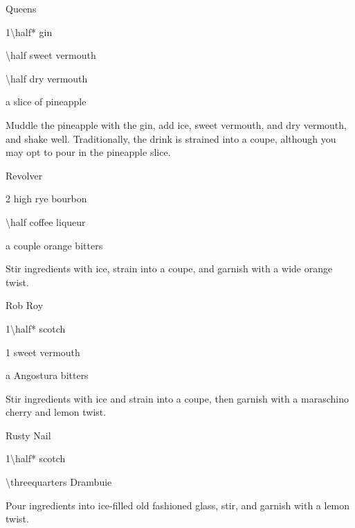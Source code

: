 \begin{Cocktail}{Queens}
	\begin{Ingredients}
	\item \SI{1\half*}{\oz} gin
	\item \SI{\half}{\oz} sweet vermouth
	\item \SI{\half}{\oz} dry vermouth
	\item a slice of pineapple
	\end{Ingredients}
	
	\begin{Instructions}
	Muddle the pineapple with the gin, add ice, sweet vermouth, and dry vermouth, and shake well.  Traditionally, the drink is strained into a coupe, although you may opt to pour in the pineapple slice.
	\end{Instructions}
\end{Cocktail}

\begin{Cocktail}{Revolver}
	\begin{Ingredients}
	\item \SI{2}{\oz} high rye bourbon
	\item \SI{\half}{\oz} coffee liqueur
	\item a couple \si{\dashes} orange bitters
	\end{Ingredients}
	
	\begin{Instructions}
	Stir ingredients with ice, strain into a coupe, and garnish with a wide orange twist.
	\end{Instructions}
\end{Cocktail}

\begin{Cocktail}{Rob Roy}
	\begin{Ingredients}
	\item \SI{1\half*}{\oz} scotch
	\item \SI{1}{\oz} sweet vermouth
	\item a \si{\dash} Angostura bitters
	\end{Ingredients}
	
	\begin{Instructions}
	Stir ingredients with ice and strain into a coupe, then garnish with a maraschino cherry and lemon twist.
	\end{Instructions}
\end{Cocktail}

\begin{Cocktail}{Rusty Nail}
	\begin{Ingredients}
	\item \SI{1\half*}{\oz} scotch
	\item \SI{\threequarters}{\oz} Drambuie
	\end{Ingredients}
	
	\begin{Instructions}
	Pour ingredients into ice-filled old fashioned glass, stir, and garnish with a lemon twist.
	\end{Instructions}
\end{Cocktail}

